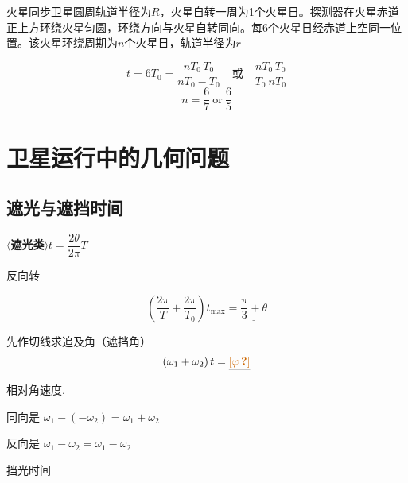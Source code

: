 \begin{problem}
火星同步卫星圆周轨道半径为$R$，火星自转一周为1个火星日。探测器在火星赤道正上方环绕火星匀圆，环绕方向与火星自转同向。每6个火星日经赤道上空同一位置。该火星环绕周期为$n$个火星日，轨道半径为$r$
\begin{solution}
\[
t=6T_0=\frac{nT_0\,T_0}{nT_0-T_0}\quad\text{或}\quad\frac{nT_0\,T_0}{T_0\ nT_0}
\]
\[
n=\frac{6}{7}\ \text{or}\ \frac{6}{5}
\]
\end{solution}
\end{problem}


\section{卫星运行中的几何问题}
\subsection{遮光与遮挡时间}
$\langle$\textbf{遮光类}$\rangle$\quad $t=\dfrac{2\theta}{2\pi}T$%


反向转

\[ \left(\frac{2\pi}{T}+\frac{2\pi}{T_0}\right)t_{\max}=\underline{\frac{\pi}{3}+\theta} \]

先作切线\quad 求追及角（遮挡角）
\[ (\omega_1+\omega_2)\,t=\underline{\unclear{\varphi}} \]%

相对角速度.

同向是 $\omega_1-(-\omega_2)=\omega_1+\omega_2$%

反向是 $\omega_1-\omega_2=\omega_1-\omega_2$


\quad \red{$2\varphi=2\alpha+2\beta$}

挡光时间 


